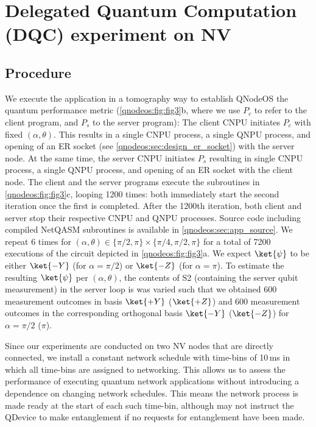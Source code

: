 \section{Delegated Quantum Computation (DQC) experiment on NV}
\label{qnodeos:sec:delcomp}

\subsection{Procedure}

We execute the application in a tomography way to establish \ac{QNodeOS} the quantum performance metric (\cref{qnodeos:fig:fig3}b, where we use $P_c$ to refer to the client program, and $P_s$ to the server program): The client \ac{CNPU} initiates $P_c$ with fixed $(\alpha, \theta)$. This results in a single \ac{CNPU} process, a single \ac{QNPU} process, and opening of an \ac{ER} socket (see \cref{qnodeos:sec:design_er_socket}) with the server node. At the same time, the server \ac{CNPU} initiates $P_s$ resulting in single \ac{CNPU} process, a single \ac{QNPU} process, and opening of an \ac{ER} socket with the client node. The client and the server programs execute the subroutines in \cref{qnodeos:fig:fig3}c, looping 1200 times: both immediately start the second iteration once the first is completed. After the 1200th iteration, both client and server stop their respective \ac{CNPU} and \ac{QNPU} processes. Source code including compiled NetQASM subroutines is available in \cref{qnodeos:sec:app_source}. We repeat 6 times for $(\alpha, \theta) \in \{\pi/2, \pi\} \times \{\pi/4, \pi/2, \pi\}$ for a total of 7200 executions of the circuit depicted in \cref{qnodeos:fig:fig3}a. We expect $\ket{\psi}$ to be either $\ket{-Y}$ (for $\alpha = \pi/2$) or $\ket{-Z}$ (for $\alpha = \pi$). To estimate the resulting $\ket{\psi}$ per $(\alpha, \theta)$, the contents of S2 (containing the server qubit measurement) in the server loop is was varied such that we obtained 600 measurement outcomes in basis $\ket{+Y}$ ($\ket{+Z}$) and 600 measurement outcomes in the corresponding orthogonal basis $\ket{-Y}$ ($\ket{-Z}$) for $\alpha = \pi/2$ ($\pi$).

Since our experiments are conducted on two \ac{NV} nodes that are directly connected, we install a constant network schedule with time-bins of 10\,ms in which all time-bins are assigned to networking. This allows us to assess the performance of executing quantum network applications without introducing a dependence on changing network schedules. This means the network process is made ready at the start of each such time-bin, although may not instruct the \ac{QDevice} to make entanglement if no requests for entanglement have been made.

